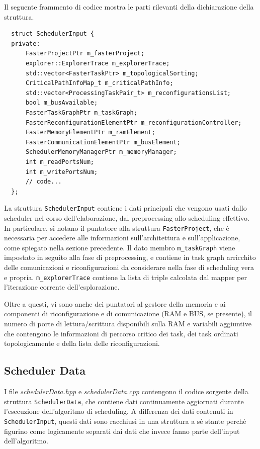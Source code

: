 Il seguente frammento di codice mostra le parti rilevanti della 
dichiarazione della struttura.
\newline
\begin{verbatim}
  struct SchedulerInput {
  private:
      FasterProjectPtr m_fasterProject;
      explorer::ExplorerTrace m_explorerTrace;
      std::vector<FasterTaskPtr> m_topologicalSorting;
      CriticalPathInfoMap_t m_criticalPathInfo;
      std::vector<ProcessingTaskPair_t> m_reconfigurationsList;
      bool m_busAvailable;
      FasterTaskGraphPtr m_taskGraph;
      FasterReconfigurationElementPtr m_reconfigurationController;
      FasterMemoryElementPtr m_ramElement;
      FasterCommunicationElementPtr m_busElement;
      SchedulerMemoryManagerPtr m_memoryManager;
      int m_readPortsNum;
      int m_writePortsNum;
      // code...
  };
\end{verbatim}
La struttura \verb+SchedulerInput+ contiene i dati principali che vengono usati 
dallo scheduler nel corso dell'elaborazione, dal preprocessing allo scheduling 
effettivo. In particolare, si notano il puntatore alla struttura 
\verb+FasterProject+, che è necessaria per accedere alle informazioni 
sull'architettura e sull'applicazione, come spiegato nella sezione precedente.
Il dato membro \verb+m_taskGraph+ viene impostato in seguito alla fase di 
preprocessing, e contiene in task graph arricchito delle comunicazioni e 
riconfigurazioni da considerare nella fase di scheduling vera e propria. 
\verb+m_explorerTrace+ contiene la lista di triple calcolata dal mapper per 
l'iterazione corrente dell'esplorazione.

Oltre a questi, vi sono anche dei puntatori al gestore della memoria e ai 
componenti di riconfigurazione e di comunicazione (\acs{RAM} e BUS, se 
presente), il numero di porte di lettura/scrittura disponibili sulla \acs{RAM} 
e variabili aggiuntive che contengono le informazioni di percorso critico dei 
task, dei task ordinati topologicamente e della lista delle riconfigurazioni.

\subsection{Scheduler Data}
I file \emph{schedulerData.hpp} e \emph{schedulerData.cpp} contengono il codice 
sorgente della struttura \verb+SchedulerData+, che contiene dati continuamente 
aggiornati durante l'esecuzione dell'algoritmo di scheduling. A differenza dei 
dati contenuti in \verb+SchedulerInput+, questi dati sono racchiusi in una 
struttura a sé stante perchè figurino come logicamente separati dai dati che 
invece fanno parte dell'input dell'algoritmo.

